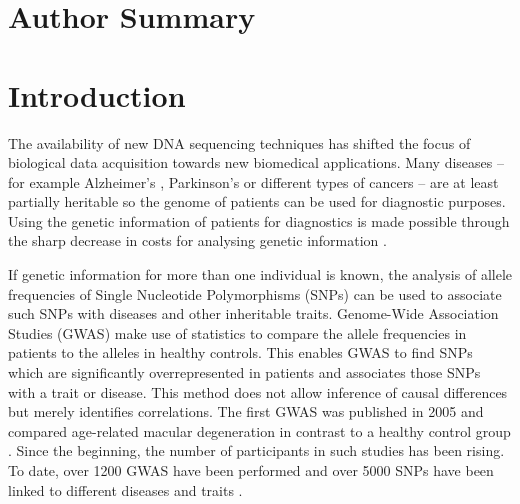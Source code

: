 \documentclass[10pt]{article}
\begin{document}
\section*{Author Summary}

\section*{Introduction}

The availability of new DNA sequencing techniques has shifted the focus of biological data acquisition towards new biomedical applications.
Many diseases – for example Alzheimer's \cite{alzheimer}, Parkinson's \cite{parkinsons} or different types of cancers \cite{breastcancer,prostatecancer} – are at least partially heritable so the genome 
of patients can be used for diagnostic purposes. Using the genetic information of patients for diagnostics is made possible through the sharp decrease in costs for analysing genetic information \cite{Brown1999}. 



If genetic information for more than one individual is known, the analysis of
allele frequencies of Single Nucleotide Polymorphisms (SNPs) can be used to associate such SNPs with diseases and other inheritable traits. Genome-Wide Association Studies
(GWAS) make use of statistics to compare the allele frequencies in patients to the alleles in healthy controls. This
enables GWAS to find SNPs which are significantly overrepresented in patients and associates those SNPs with a trait or disease.
This method does not allow inference of causal differences but merely identifies correlations. 
The first GWAS was published in 2005 and compared age-related macular degeneration in contrast 
to a healthy control group \cite{Klein2005}. Since the beginning, the number of participants in 
such studies has been rising. To date, over 1200 GWAS have been performed \cite{Johnson2009} and over 
5000 SNPs have been linked to different diseases and traits \cite{Hindorff2009}.   
\end{document}
